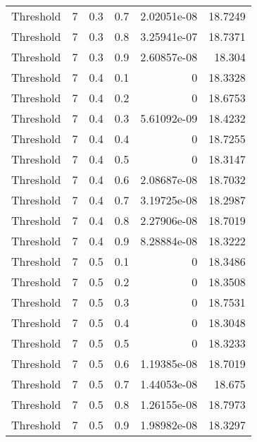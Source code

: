 \documentclass{article}
\begin{document}
\begin{longtable}[H]{lrrrrr}
 Threshold      &       7 &   0.3 &            0.7 &   2.02051e-08 &         18.7249 \\
 Threshold      &       7 &   0.3 &            0.8 &   3.25941e-07 &         18.7371 \\
 Threshold      &       7 &   0.3 &            0.9 &   2.60857e-08 &         18.304  \\
 Threshold      &       7 &   0.4 &            0.1 &   0           &         18.3328 \\
 Threshold      &       7 &   0.4 &            0.2 &   0           &         18.6753 \\
 Threshold      &       7 &   0.4 &            0.3 &   5.61092e-09 &         18.4232 \\
 Threshold      &       7 &   0.4 &            0.4 &   0           &         18.7255 \\
 Threshold      &       7 &   0.4 &            0.5 &   0           &         18.3147 \\
 Threshold      &       7 &   0.4 &            0.6 &   2.08687e-08 &         18.7032 \\
 Threshold      &       7 &   0.4 &            0.7 &   3.19725e-08 &         18.2987 \\
 Threshold      &       7 &   0.4 &            0.8 &   2.27906e-08 &         18.7019 \\
 Threshold      &       7 &   0.4 &            0.9 &   8.28884e-08 &         18.3222 \\
 Threshold      &       7 &   0.5 &            0.1 &   0           &         18.3486 \\
 Threshold      &       7 &   0.5 &            0.2 &   0           &         18.3508 \\
 Threshold      &       7 &   0.5 &            0.3 &   0           &         18.7531 \\
 Threshold      &       7 &   0.5 &            0.4 &   0           &         18.3048 \\
 Threshold      &       7 &   0.5 &            0.5 &   0           &         18.3233 \\
 Threshold      &       7 &   0.5 &            0.6 &   1.19385e-08 &         18.7019 \\
 Threshold      &       7 &   0.5 &            0.7 &   1.44053e-08 &         18.675  \\
 Threshold      &       7 &   0.5 &            0.8 &   1.26155e-08 &         18.7973 \\
 Threshold      &       7 &   0.5 &            0.9 &   1.98982e-08 &         18.3297 \\

\end{longtable}
\end{document}
